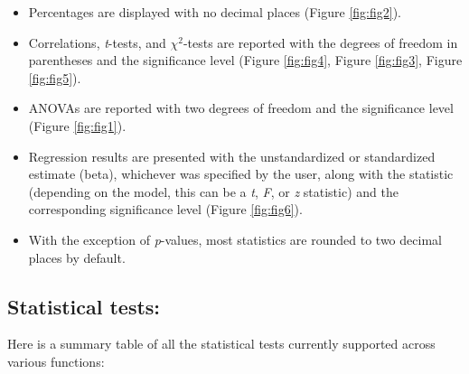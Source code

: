 \documentclass[
]{article}
\begin{document}
\begin{itemize}
\item
  Percentages are displayed with no decimal places (Figure \ref{fig:fig2}).
\item
  Correlations, \emph{t}-tests, and \(\chi^2\)-tests are reported with the degrees
  of freedom in parentheses and the significance level (Figure \ref{fig:fig4},
  Figure \ref{fig:fig3}, Figure \ref{fig:fig5}).
\item
  ANOVAs are reported with two degrees of freedom and the significance level
  (Figure \ref{fig:fig1}).
\item
  Regression results are presented with the unstandardized or standardized
  estimate (beta), whichever was specified by the user, along with the
  statistic (depending on the model, this can be a \emph{t}, \emph{F}, or \emph{z} statistic)
  and the corresponding significance level (Figure \ref{fig:fig6}).
\item
  With the exception of \emph{p}-values, most statistics are rounded to two decimal
  places by default.
\end{itemize}

\hypertarget{statistical-tests}{%
\subsection{Statistical tests:}\label{statistical-tests}}

Here is a summary table of all the statistical tests currently supported across
various functions:
\end{document}
